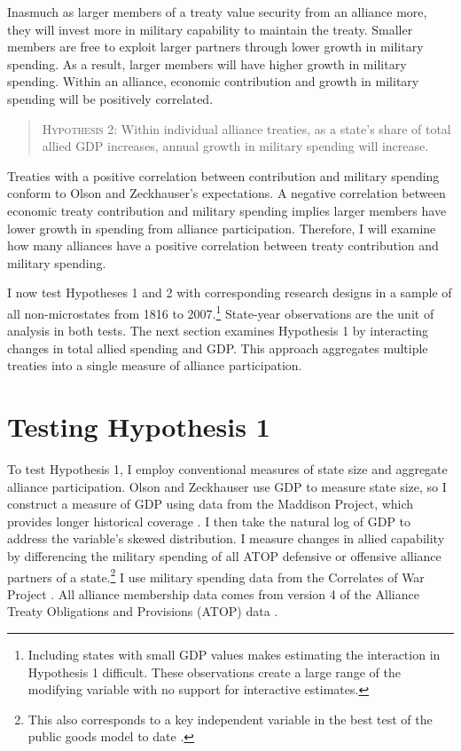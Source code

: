 \documentclass[12pt]{article}
\begin{document}
Inasmuch as larger members of a treaty value security from an alliance more, they will invest more in military capability to maintain the treaty.
Smaller members are free to exploit larger partners through lower growth in military spending. 
As a result, larger members will have higher growth in military spending. 
Within an alliance, economic contribution and growth in military spending will be positively correlated. 


\begin{quote}
\textsc{Hypothesis 2}: Within individual alliance treaties, as a state's share of total allied GDP increases, annual growth in military spending will increase. 
\end{quote}


Treaties with a positive correlation between contribution and military spending conform to Olson and Zeckhauser's expectations. 
A negative correlation between economic treaty contribution and military spending implies larger members have lower growth in spending from alliance participation. 
Therefore, I will examine how many alliances have a positive correlation between treaty contribution and military spending.  


I now test Hypotheses 1 and 2 with corresponding research designs in a sample of all non-microstates from 1816 to 2007.\footnote{Including states with small GDP values makes estimating the interaction in Hypothesis 1 difficult. These observations create a large range of the modifying variable with no support for interactive estimates.}
State-year observations are the unit of analysis in both tests.  
The next section examines Hypothesis 1 by interacting changes in total allied spending and GDP.
This approach aggregates multiple treaties into a single measure of alliance participation. 


\section{Testing Hypothesis 1}


To test Hypothesis 1, I employ conventional measures of state size and aggregate alliance participation. 
Olson and Zeckhauser use GDP to measure state size, so I construct a measure of GDP using data from the Maddison Project, which provides longer historical coverage \citep{Boltetal2018}. 
I then take the natural log of GDP to address the variable's skewed distribution. 
I measure changes in allied capability by differencing the military spending of all ATOP defensive or offensive alliance partners of a state.\footnote{This also corresponds to a key independent variable in the best test of the public goods model to date \citep{PluemperNeumayer2015}.}
I use military spending data from the Correlates of War Project \citep{SingerCINC1988}.  
All alliance membership data comes from version 4 of the Alliance Treaty Obligations and Provisions (ATOP) data \citep{Leedsetal2002}.  
\end{document}
